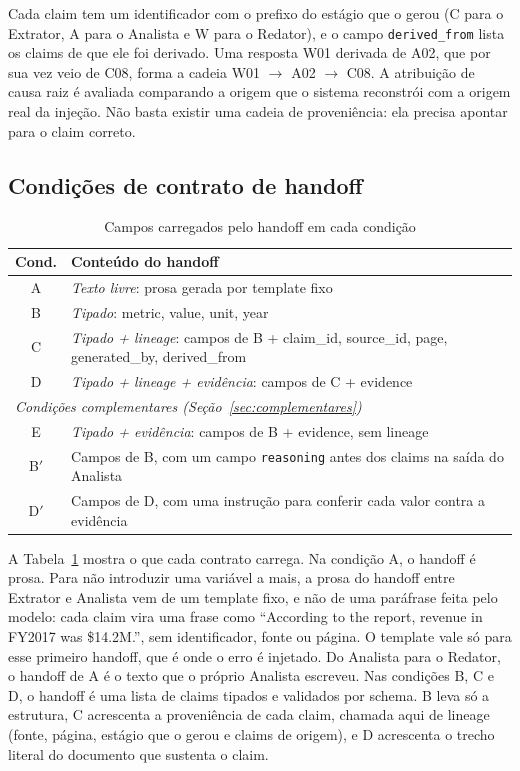 Cada claim tem um identificador com o prefixo do estágio que o gerou (C para o Extrator, A para o Analista e W para o Redator), e o campo \texttt{derived\_from} lista os claims de que ele foi derivado.
Uma resposta W01 derivada de A02, que por sua vez veio de C08, forma a cadeia W01 $\rightarrow$ A02 $\rightarrow$ C08.
A atribuição de causa raiz é avaliada comparando a origem que o sistema reconstrói com a origem real da injeção. Não basta existir uma cadeia de proveniência: ela precisa apontar para o claim correto.

\subsection{Condições de contrato de handoff}\label{sec:condicoes}

\begin{table}[htbp]
\caption{Campos carregados pelo handoff em cada condição}
\label{tab:condicoes}
\centering
\footnotesize
\setlength{\tabcolsep}{4pt}
\begin{tabular}{|c|>{\raggedright\arraybackslash}p{}|}
\hline
\textbf{Cond.} & \textbf{Conteúdo do handoff} \\
\hline
A & \textit{Texto livre}: prosa gerada por template fixo \\
\hline
B & \textit{Tipado}: metric, value, unit, year \\
\hline
C & \textit{Tipado + lineage}: campos de B + claim\_id, source\_id, page, generated\_by, derived\_from \\
\hline
D & \textit{Tipado + lineage + evidência}: campos de C + evidence \\
\hline
\multicolumn{2}{|l|}{\textit{Condições complementares (Seção~\ref{sec:complementares})}} \\
\hline
E & \textit{Tipado + evidência}: campos de B + evidence, sem lineage \\
\hline
B$'$ & Campos de B, com um campo \texttt{reasoning} antes dos claims na saída do Analista \\
\hline
D$'$ & Campos de D, com uma instrução para conferir cada valor contra a evidência \\
\hline
\end{tabular}
\end{table}

A Tabela~\ref{tab:condicoes} mostra o que cada contrato carrega.
Na condição A, o handoff é prosa. Para não introduzir uma variável a mais, a prosa do handoff entre Extrator e Analista vem de um template fixo, e não de uma paráfrase feita pelo modelo: cada claim vira uma frase como ``According to the report, revenue in FY2017 was \$14.2M.'', sem identificador, fonte ou página.
O template vale só para esse primeiro handoff, que é onde o erro é injetado. Do Analista para o Redator, o handoff de A é o texto que o próprio Analista escreveu.
Nas condições B, C e D, o handoff é uma lista de claims tipados e validados por schema.
B leva só a estrutura, C acrescenta a proveniência de cada claim, chamada aqui de lineage (fonte, página, estágio que o gerou e claims de origem), e D acrescenta o trecho literal do documento que sustenta o claim.

